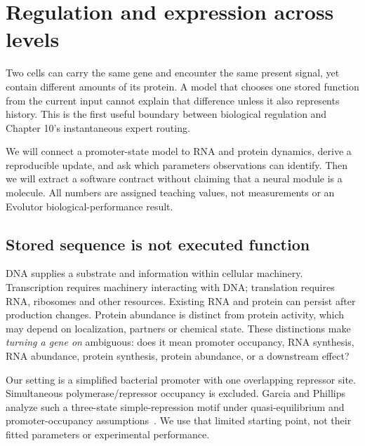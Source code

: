 \chapter{Regulation and expression across levels}
Two cells can carry the same gene and encounter the same present signal,
yet contain different amounts of its protein. A model that chooses one
stored function from the current input cannot explain that difference unless
it also represents history. This is the first useful boundary between
biological regulation and Chapter 10's instantaneous expert routing.

We will connect a promoter-state model to RNA and protein dynamics,
derive a reproducible update, and ask which parameters observations can
identify. Then we will extract a software contract without claiming that a
neural module is a molecule. All numbers are assigned teaching values,
not measurements or an Evolutor biological-performance result.

\section{Stored sequence is not executed function}
DNA supplies a substrate and information within cellular machinery.
Transcription requires machinery interacting with DNA; translation requires
RNA, ribosomes and other resources. Existing RNA and protein can persist
after production changes. Protein abundance is distinct from protein
activity, which may depend on localization, partners or chemical state.
These distinctions make \emph{turning a gene on} ambiguous: does it mean
promoter occupancy, RNA synthesis, RNA abundance, protein synthesis,
protein abundance, or a downstream effect?

Our setting is a simplified bacterial promoter with one overlapping repressor
site. Simultaneous polymerase/repressor occupancy is excluded.
Garcia and Phillips analyze such a three-state simple-repression motif under
quasi-equilibrium and promoter-occupancy assumptions~\cite{garcia}.
We use that limited starting point, not their fitted parameters or experimental
performance.


